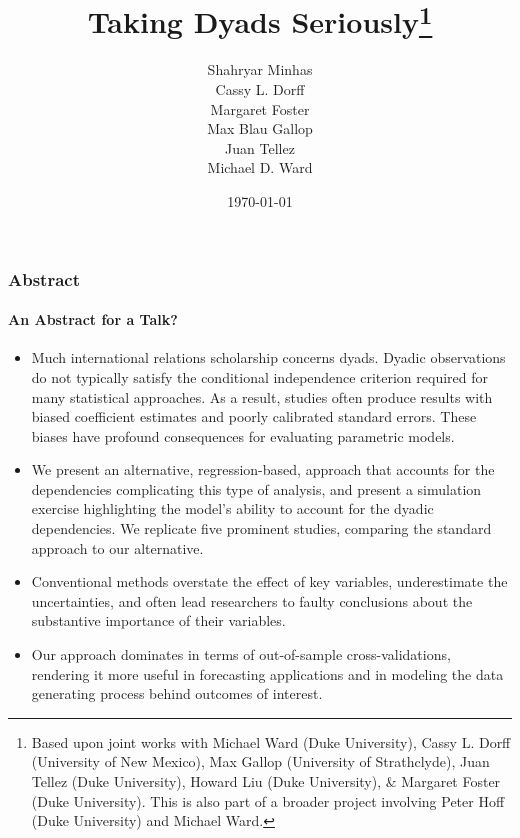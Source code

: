 \documentclass[10pt, compress]{beamer}
\title[AMEN]{Taking Dyads Seriously\thanks{Based upon joint works with Michael Ward (Duke University), Cassy L. Dorff (University of New Mexico), Max Gallop (University of Strathclyde), Juan Tellez (Duke University), Howard Liu (Duke University), \& Margaret Foster (Duke University). This is also part of a broader project involving Peter Hoff (Duke University) and Michael Ward.}
}
\author{Shahryar Minhas\\Cassy L. Dorff\\Margaret Foster\\Max Blau Gallop\\Juan Tellez\\ Michael D. Ward}
\date{\today}
\begin{document}
\frame{\titlepage}




\begin{frame}
\frametitle{Abstract}
\framesubtitle{An Abstract for a Talk?}
\begin{itemize}
\item Much international relations scholarship concerns dyads. Dyadic observations do not typically satisfy the conditional independence criterion required for many statistical approaches. As a result, studies often produce results with biased coefficient estimates and poorly calibrated standard errors. These biases have profound consequences for evaluating parametric models. 

\item We present an alternative, regression-based, approach that accounts for the dependencies complicating this type of analysis, and present a simulation exercise highlighting the model's ability to account for the dyadic dependencies. We replicate five prominent studies, comparing the standard approach to our alternative. 

\item Conventional methods overstate the effect of key variables, underestimate the uncertainties, and often lead researchers to faulty conclusions about the substantive importance of their variables. 

\item Our approach dominates in terms of out-of-sample cross-validations, rendering it more useful in forecasting applications and in modeling the data generating process behind outcomes of interest.
\end{itemize}
\end{frame}
\end{document}
